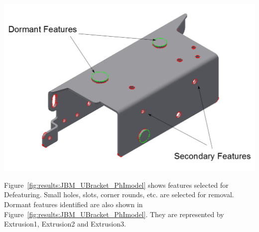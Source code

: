 \begin{minipage}{\linewidth}
\begin{minipage}[c]{0.62\linewidth}
\includegraphics[width=\linewidth,valign=t]{../Common/images/JBM_UBracket_PhI_model}
 \label{fig:results:JBM_UBracket_PhImodel}


Figure~\ref{fig:results:JBM_UBracket_PhImodel} shows features selected for Defeaturing. Small holes, slots, corner rounds, etc. are selected for removal. Dormant features identified are also shown in  Figure~\ref{fig:results:JBM_UBracket_PhImodel}. They are represented by Extrusion1, Extrusion2 and Extrusion3.



\end{minipage}
\end{minipage}
